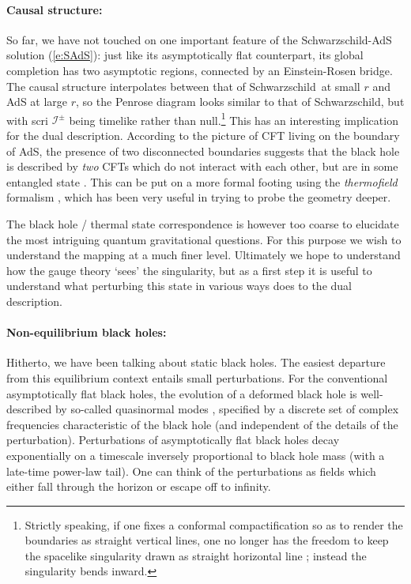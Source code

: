 \documentclass[12pt,a4paper]{article}
\def\req#1{(\ref{#1})}
\def\schw{Schwarzschild}
\def\scri{\mathscr I}
\begin{document}
\paragraph{Causal structure:}  %
So far, we have not touched on one important feature of the  \schw-AdS solution \req{e:SAdS}: just like its asymptotically flat counterpart, its global completion has two asymptotic regions, connected by an Einstein-Rosen bridge.
The causal structure interpolates between that of \schw\ at small $r$ and AdS at large $r$, so the Penrose diagram looks similar to that of \schw, but with scri $\scri^\pm$ being timelike rather than null.\footnote{
Strictly speaking, if one fixes a conformal compactification so as to render the boundaries as straight vertical lines, one no longer has the freedom to keep the spacelike singularity drawn as straight horizontal line \cite{Fidkowski:2003nf}; instead the singularity bends inward.
}
This has an interesting implication for the dual description.  According to the picture of CFT living on the boundary of AdS, the presence of two disconnected boundaries suggests that the black hole is described by {\it two} CFTs which do not interact with each other, but are in some entangled state \cite{Maldacena:2001kr}.  This can be put on a more formal footing using the {\it thermofield} formalism \cite{israel1976thermo}, which has been very useful in trying to probe the geometry deeper.

The black hole / thermal state correspondence is however too coarse to elucidate the most intriguing quantum gravitational questions.  For this purpose we wish to understand the mapping at a much finer level.  Ultimately we hope to understand how the gauge theory `sees' the singularity, but as a first step it is useful to understand what perturbing this state in various ways does to the dual description.

\paragraph{Non-equilibrium black holes:}  %
Hitherto, we have been talking about static black holes.  The easiest departure from this equilibrium context entails small perturbations.  For the conventional asymptotically flat black holes, the  evolution of a deformed black hole is  well-described by so-called quasinormal modes \cite{Kokkotas:1999bd}, specified by a discrete set of complex frequencies characteristic of the black hole (and independent of the details of the perturbation).
Perturbations of asymptotically flat black holes decay exponentially on a timescale inversely proportional to black hole mass (with a late-time power-law tail).  One can think of the perturbations as fields which either fall through the horizon or escape off to infinity.  
\end{document}
